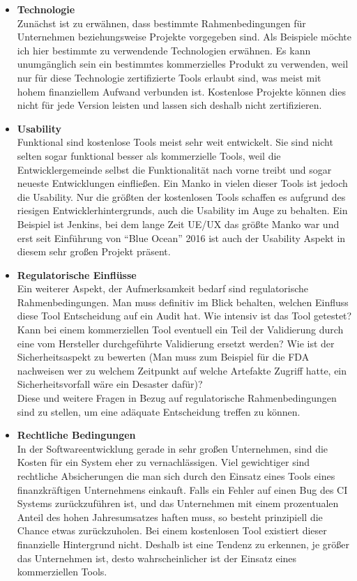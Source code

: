 \begin{itemize}
	\item \textbf{Technologie}\\
	Zunächst ist zu erwähnen, dass bestimmte Rahmenbedingungen für Unternehmen beziehungsweise Projekte vorgegeben sind. Als Beispiele möchte ich hier bestimmte zu verwendende Technologien erwähnen. Es kann unumgänglich sein ein bestimmtes kommerzielles Produkt zu verwenden, weil nur für diese Technologie zertifizierte Tools erlaubt sind, was meist mit hohem finanziellem Aufwand verbunden ist. Kostenlose Projekte können dies nicht für jede Version leisten und lassen sich deshalb nicht zertifizieren.
	\item \textbf{Usability}\\
	Funktional sind kostenlose Tools meist sehr weit entwickelt. Sie sind nicht selten sogar funktional besser als kommerzielle Tools, weil die Entwicklergemeinde selbst die Funktionalität nach vorne treibt und sogar neueste Entwicklungen einfließen. Ein Manko in vielen dieser Tools ist jedoch die Usability. Nur die größten der kostenlosen Tools schaffen es aufgrund des riesigen Entwicklerhintergrunds, auch die Usability im Auge zu behalten. Ein Beispiel ist Jenkins, bei dem lange Zeit UE/UX das größte Manko war und erst seit Einführung von "`Blue Ocean"' 2016 ist auch der Usability Aspekt in diesem sehr großen Projekt präsent.
	\item \textbf{Regulatorische Einflüsse}\\
	Ein weiterer Aspekt, der Aufmerksamkeit bedarf sind regulatorische Rahmenbedingungen. Man muss definitiv im Blick behalten, welchen Einfluss diese Tool Entscheidung auf ein Audit hat. Wie intensiv ist das Tool getestet? Kann bei einem kommerziellen Tool eventuell ein Teil der Validierung durch eine vom Hersteller durchgeführte Validierung ersetzt werden? Wie ist der Sicherheitsaspekt zu bewerten (Man muss zum Beispiel für die FDA nachweisen wer zu welchem Zeitpunkt auf welche Artefakte Zugriff hatte, ein Sicherheitsvorfall wäre ein Desaster dafür)?\\
	Diese und weitere Fragen in Bezug auf regulatorische Rahmenbedingungen sind zu stellen, um eine adäquate Entscheidung treffen zu können.
	\item \textbf{Rechtliche Bedingungen}\\
	In der Softwareentwicklung gerade in sehr großen Unternehmen, sind die Kosten für ein System eher zu vernachlässigen. Viel gewichtiger sind rechtliche Absicherungen die man sich durch den Einsatz eines Tools eines finanzkräftigen Unternehmens einkauft. Falls ein Fehler auf einen Bug des CI Systems zurückzuführen ist, und das Unternehmen mit einem prozentualen Anteil des hohen Jahresumsatzes haften muss, so besteht prinzipiell die Chance etwas zurückzuholen. Bei einem kostenlosen Tool existiert dieser finanzielle Hintergrund nicht. Deshalb ist eine Tendenz zu erkennen, je größer das Unternehmen ist, desto wahrscheinlicher ist der Einsatz eines kommerziellen Tools.
	\end{itemize}
